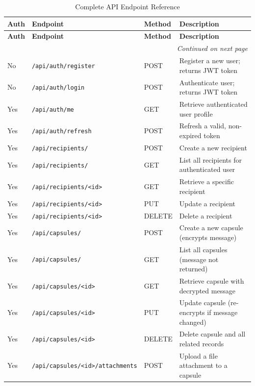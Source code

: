 \documentclass[12pt, a4paper]{article}
\begin{document}
\begin{appendices}
\begin{longtable}{|p{1cm}|p{4.5cm}|l|p{6cm}|}
\caption{Complete API Endpoint Reference}
\label{tab:api_full}\\
\hline
\textbf{Auth} & \textbf{Endpoint} & \textbf{Method} & \textbf{Description} \\
\hline
\endfirsthead
\hline
\textbf{Auth} & \textbf{Endpoint} & \textbf{Method} & \textbf{Description} \\
\hline
\endhead
\hline
\multicolumn{4}{r}{\textit{Continued on next page}}\\
\endfoot
\hline
\endlastfoot

No  & \texttt{/api/auth/register}          & POST   & Register a new user; returns JWT token \\
\hline
No  & \texttt{/api/auth/login}             & POST   & Authenticate user; returns JWT token \\
\hline
Yes & \texttt{/api/auth/me}                & GET    & Retrieve authenticated user profile \\
\hline
Yes & \texttt{/api/auth/refresh}           & POST   & Refresh a valid, non-expired token \\
\hline
Yes & \texttt{/api/recipients/}            & POST   & Create a new recipient \\
\hline
Yes & \texttt{/api/recipients/}            & GET    & List all recipients for authenticated user \\
\hline
Yes & \texttt{/api/recipients/<id>}        & GET    & Retrieve a specific recipient \\
\hline
Yes & \texttt{/api/recipients/<id>}        & PUT    & Update a recipient \\
\hline
Yes & \texttt{/api/recipients/<id>}        & DELETE & Delete a recipient \\
\hline
Yes & \texttt{/api/capsules/}              & POST   & Create a new capsule (encrypts message) \\
\hline
Yes & \texttt{/api/capsules/}              & GET    & List all capsules (message not returned) \\
\hline
Yes & \texttt{/api/capsules/<id>}          & GET    & Retrieve capsule with decrypted message \\
\hline
Yes & \texttt{/api/capsules/<id>}          & PUT    & Update capsule (re-encrypts if message changed) \\
\hline
Yes & \texttt{/api/capsules/<id>}          & DELETE & Delete capsule and all related records \\
\hline
Yes & \texttt{/api/capsules/<id>/attachments} & POST   & Upload a file attachment to a capsule \\

\end{longtable}
\end{appendices}
\end{document}

